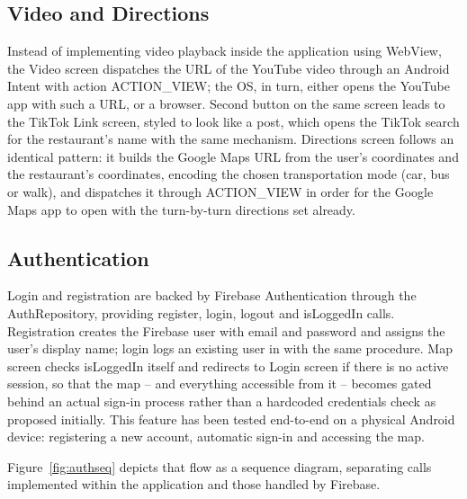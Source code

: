 \documentclass[12pt, a4paper]{article}
\begin{document}
\subsection{Video and Directions}

Instead of implementing video playback inside the application using WebView, the Video screen dispatches the URL of the YouTube video through an Android Intent with action ACTION\_VIEW; the OS, in turn, either opens the YouTube app with such a URL, or a browser. Second button on the same screen leads to the TikTok Link screen, styled to look like a post, which opens the TikTok search for the restaurant's name with the same mechanism. Directions screen follows an identical pattern: it builds the Google Maps URL from the user's coordinates and the restaurant's coordinates, encoding the chosen transportation mode (car, bus or walk), and dispatches it through ACTION\_VIEW in order for the Google Maps app to open with the turn-by-turn directions set already.

\subsection{Authentication}

Login and registration are backed by Firebase Authentication \citep{firebase_auth} through the AuthRepository, providing register, login, logout and isLoggedIn calls. Registration creates the Firebase user with email and password and assigns the user's display name; login logs an existing user in with the same procedure. Map screen checks isLoggedIn itself and redirects to Login screen if there is no active session, so that the map -- and everything accessible from it -- becomes gated behind an actual sign-in process rather than a hardcoded credentials check as proposed initially. This feature has been tested end-to-end on a physical Android device: registering a new account, automatic sign-in and accessing the map.

Figure~\ref{fig:authseq} depicts that flow as a sequence diagram, separating calls implemented within the application and those handled by Firebase.
\end{document}
